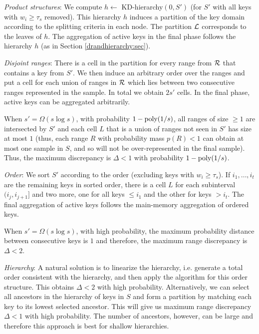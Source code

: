 \documentclass[11pt]{article}
\begin{document}
\begin{trivlist}
\item {\em Product structures}: 
We compute $h\leftarrow$ {\sc KD-hierarchy}$(0,S')$ (for $S'$ with 
all keys with $w_i \geq \tau_s$ removed).
This hierarchy $h$ induces a partition of the key domain
according to the splitting criteria in each node.  
The partition $\mathcal{L}$ corresponds to the leaves of $h$.
The aggregation of active keys in the final phase follows the
hierarchy $h$ (as in Section \ref{drandhierarchy:sec}).

\item {\em Disjoint ranges}: 
There is a cell in the partition for every range from $\mathcal{R}$
that contains a key from $S'$.
We then induce an arbitrary order over the ranges
and put a cell for each union of ranges in $\mathcal{R}$ 
which lies between two
consecutive ranges represented in the sample.  
In total we obtain $2s'$ cells.   
In the final phase, active keys can be aggregated arbitrarily.

When $s' =\Omega(s\log s)$,
with probability $1-\textnormal{poly}(1/s)$, all ranges of size $\geq 1$ are
 intersected by $S'$ and each cell $L$ that is a union of ranges not
 seen in $S'$ has size at most $1$ 
(thus, each range $R$ with probability mass $p(R)<1$ 
  can obtain at most one sample in $S$, and so will not be
  over-represented in the final sample).  
Thus, the maximum discrepancy is
  $\Delta<1$ with probability $1-\textnormal{poly}(1/s)$.

\item {\em Order}:
 We sort $S'$ according to the order (excluding keys with
$w_i\geq \tau_s$).  
If $i_1,\ldots,i_t$ are the remaining keys in sorted order, 
there is a cell $L$ for each subinterval
 $(i_j,i_{j+1}]$ and two more, 
 one for all keys $\leq i_1$ and the other for keys  $>i_t$. 
The final aggregation of active keys follows the main-memory
aggregation of ordered keys. 

When $s'=\Omega(s\log s)$, with high probability, the maximum
probability distance between consecutive keys is $1$ and therefore,
the maximum range discrepancy is $\Delta<2$.

\item {\em Hierarchy}:
A natural solution is to linearize the hierarchy, i.e. 
generate a total order consistent with the hierarchy, 
and then apply the algorithm for this order
structure.
This obtains $\Delta<2$ with high probability. 
Alternatively, we can select all ancestors in the hierarchy of keys
 in $S$ and form a partition by matching each key to its lowest
 selected ancestor.  This will give us maximum range discrepancy
 $\Delta<1$  with high probability.   
The number of ancestors, however, can be large and therefore
this approach is best for shallow hierarchies.  
\end{trivlist}
\end{document}
